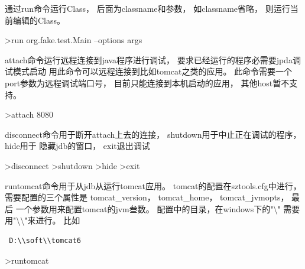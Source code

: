 \documentclass[oneside,openany]{book}
\begin{document}
    通过run命令运行Class， 后面为classname和参数， 如classname省略， 则运行当前编辑的Class。
    \begin{mdframed}[style=SmallFrame]
    \begin{flushleft}
    >run org.fake.test.Main --options args
    \end{flushleft}
    \end{mdframed}
    \vspace{4mm}

    attach命令运行远程连接到java程序进行调试， 要求已经运行的程序必需要jpda调试模式启动
    用此命令可以远程连接到比如tomcat之类的应用。 此命令需要一个port参数为远程调试端口号， 
    目前只能连接到本机启动的应用， 其他host暂不支持。
    \begin{mdframed}[style=SmallFrame]
    \begin{flushleft}
    >attach 8080              
    \end{flushleft}
    \end{mdframed}
    \vspace{4mm}

    disconnect命令用于断开attach上去的连接， shutdown用于中止正在调试的程序， hide用于
    隐藏jdb的窗口， exit退出调试 
    \begin{mdframed}[style=SmallFrame]
     \begin{flushleft}
    >disconnect\newline
    >shutdown\newline
    >hide\newline
    >exit                      
    \end{flushleft}
    \end{mdframed}
    \vspace{5mm}

    runtomcat命令用于从jdb从运行tomcat应用。 tomcat的配置在sztools.cfg中进行， 
    需要配置的三个属性是 tomcat\_version， tomcat\_home， tomcat\_jvmopts， 最后
    一个参数用来配置tomcat的jvm叁数。 配置中的目录，在windows下的"\textbackslash"
    需要用"\textbackslash\textbackslash"来进行。 比如
    \begin{verbatim} D:\\soft\\tomcat6 \end{verbatim}
    \begin{mdframed}[style=SmallFrame]
     \begin{flushleft}
      >runtomcat
     \end{flushleft}
    \end{mdframed}
\end{document}
